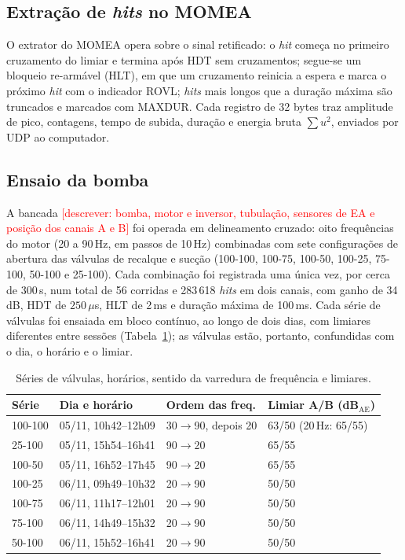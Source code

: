 \documentclass[12pt]{article}
\newcommand{\completar}[1]{\textcolor{red}{[#1]}}
\begin{document}
\subsection{Extração de \textit{hits} no MOMEA}
\label{subsec:extrator}

O extrator do MOMEA opera sobre o sinal retificado: o \textit{hit} começa no primeiro cruzamento do limiar e termina após HDT sem cruzamentos; segue-se um bloqueio re-armável (HLT), em que um cruzamento reinicia a espera e marca o próximo \textit{hit} com o indicador ROVL; \textit{hits} mais longos que a duração máxima são truncados e marcados com MAXDUR. Cada registro de 32 bytes traz amplitude de pico, contagens, tempo de subida, duração e energia bruta \(\sum u^2\), enviados por UDP ao computador.

\subsection{Ensaio da bomba}
\label{subsec:bomba}

A bancada \completar{descrever: bomba, motor e inversor, tubulação, sensores de EA e posição dos canais A e B} foi operada em delineamento cruzado: oito frequências do motor (20 a 90\,Hz, em passos de 10\,Hz) combinadas com sete configurações de abertura das válvulas de recalque e sucção (100-100, 100-75, 100-50, 100-25, 75-100, 50-100 e 25-100). Cada combinação foi registrada uma única vez, por cerca de 300\,s, num total de 56 corridas e 283\,618 \textit{hits} em dois canais, com ganho de 34\,dB, HDT de \(250\,\mu\)s, HLT de 2\,ms e duração máxima de 100\,ms. Cada série de válvulas foi ensaiada em bloco contínuo, ao longo de dois dias, com limiares diferentes entre sessões (Tabela~\ref{tab:ordem}); as válvulas estão, portanto, confundidas com o dia, o horário e o limiar.

\begin{table}[!htbp]
	\centering
	\caption{Séries de válvulas, horários, sentido da varredura de frequência e limiares.}
	\label{tab:ordem}
	\small
	\begin{tabular}{llll}
		\toprule
		\textbf{Série} & \textbf{Dia e horário} & \textbf{Ordem das freq.} & \textbf{Limiar A/B (dB\(_{\mathrm{AE}}\))} \\
		\midrule
		100-100 & 05/11, 10h42--12h09 & 30\(\rightarrow\)90, depois 20 & 63/50 (20\,Hz: 65/55) \\
		25-100 & 05/11, 15h54--16h41 & 90\(\rightarrow\)20 & 65/55 \\
		100-50 & 05/11, 16h52--17h45 & 90\(\rightarrow\)20 & 65/55 \\
		100-25 & 06/11, 09h49--10h32 & 20\(\rightarrow\)90 & 50/50 \\
		100-75 & 06/11, 11h17--12h01 & 20\(\rightarrow\)90 & 50/50 \\
		75-100 & 06/11, 14h49--15h32 & 20\(\rightarrow\)90 & 50/50 \\
		50-100 & 06/11, 15h52--16h41 & 20\(\rightarrow\)90 & 50/50 \\
		\bottomrule
	\end{tabular}
\end{table}
\end{document}
